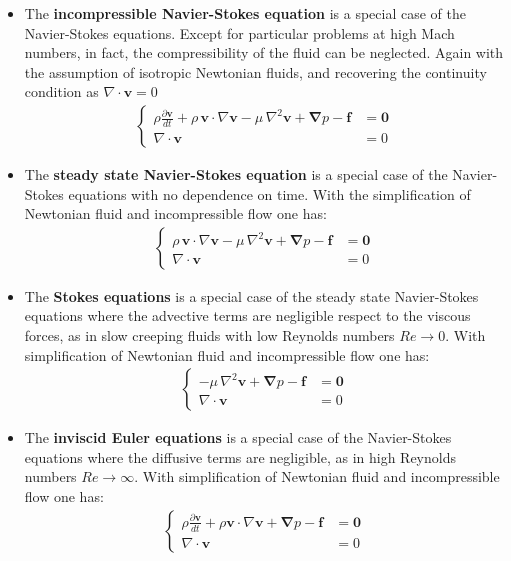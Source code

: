 \documentclass{digitaldynamics}
\def\vect#1{\bm{#1}}
\begin{document}
\begin{itemize}

\item The \textbf{incompressible Navier-Stokes equation} is a special case of the Navier-Stokes equations. Except for particular problems at high Mach numbers, in fact, the compressibility of the fluid can be neglected. Again with the assumption of isotropic Newtonian fluids, and recovering the continuity condition as $\nabla\cdot\vect{v}=0$
\begin{align}
	\left\{
	\begin{aligned}
		  \rho\frac{\partial\vect{v}}{dt} + \rho \,\vect{v} \cdot \nabla \vect{v} - \mu \,\nabla^2 \vect{v}  +\boldsymbol{\nabla}p - \vect{f} &= \vect{0} \\
			\nabla\cdot\vect{v}&= 0
	\end{aligned}
	\right.
	\label{eq:stokes}
\end{align}


\item The \textbf{steady state Navier-Stokes equation} is a special case of the Navier-Stokes equations with no dependence on time. 
With the simplification of Newtonian fluid and incompressible flow one has:
\begin{align}
	\left\{
	\begin{aligned}
		  \rho \,\vect{v} \cdot \nabla \vect{v} - \mu \,\nabla^2 \vect{v}  +\boldsymbol{\nabla}p - \vect{f} &= \vect{0} \\
			\nabla\cdot\vect{v}&= 0
	\end{aligned}
	\right.
	\label{eq:stokes}
\end{align}


\item The \textbf{Stokes equations} is a special case of the steady state Navier-Stokes equations where the advective terms are negligible respect to the viscous forces, as in slow creeping fluids with low Reynolds numbers $Re \rightarrow 0$. With simplification of Newtonian fluid and incompressible flow one has:
\begin{align}
	\left\{
	\begin{aligned}
		  -\mu \,\nabla^2 \vect{v} +\boldsymbol{\nabla}p - \vect{f} &= \vect{0} \\
			\nabla\cdot\vect{v}&= 0
	\end{aligned}
	\right.
	\label{eq:stokes}
\end{align}

\item The \textbf{inviscid Euler equations} is a special case of the Navier-Stokes equations where the diffusive terms are negligible, as in high Reynolds numbers $Re \rightarrow \infty$. With simplification of Newtonian fluid and incompressible flow one has:
\begin{align}
	\left\{
	\begin{aligned}
		  \rho\frac{\partial\vect{v}}{dt} + \rho \vect{v} \cdot \nabla \vect{v} + \boldsymbol{\nabla}p - \vect{f} &= \vect{0} \\
			\nabla\cdot\vect{v}&= 0
	\end{aligned}
	\right.
	\label{eq:stokes}
\end{align}



\end{itemize}
\end{document}
